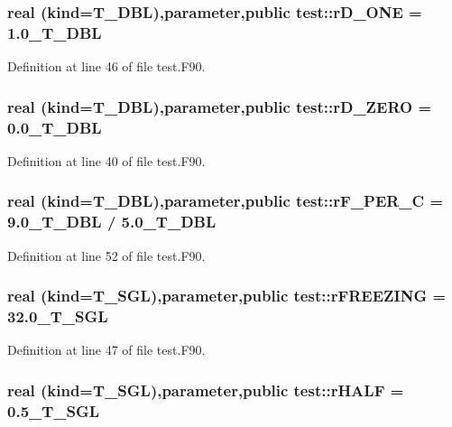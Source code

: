 \hypertarget{namespacetest_a0677b58c46e425be305a3733296635ad}{
\subsubsection[{rD\_\-ONE}]{\setlength{\rightskip}{0pt plus 5cm}real (kind={\bf T\_\-DBL}),parameter,public {\bf test::rD\_\-ONE} = 1.0\_\-T\_\-DBL}}
\label{namespacetest_a0677b58c46e425be305a3733296635ad}


Definition at line 46 of file test.F90.

\hypertarget{namespacetest_a4bd8ceae51c320c4ba797c783a5421a9}{
\subsubsection[{rD\_\-ZERO}]{\setlength{\rightskip}{0pt plus 5cm}real (kind={\bf T\_\-DBL}),parameter,public {\bf test::rD\_\-ZERO} = 0.0\_\-T\_\-DBL}}
\label{namespacetest_a4bd8ceae51c320c4ba797c783a5421a9}


Definition at line 40 of file test.F90.

\hypertarget{namespacetest_ac2670ae461db7392fc780c5fc733d06f}{
\subsubsection[{rF\_\-PER\_\-C}]{\setlength{\rightskip}{0pt plus 5cm}real (kind={\bf T\_\-DBL}),parameter,public {\bf test::rF\_\-PER\_\-C} = 9.0\_\-T\_\-DBL / 5.0\_\-T\_\-DBL}}
\label{namespacetest_ac2670ae461db7392fc780c5fc733d06f}


Definition at line 52 of file test.F90.

\hypertarget{namespacetest_a31db6c3796f52bf10cc407ec22ba3e80}{
\subsubsection[{rFREEZING}]{\setlength{\rightskip}{0pt plus 5cm}real (kind={\bf T\_\-SGL}),parameter,public {\bf test::rFREEZING} = 32.0\_\-T\_\-SGL}}
\label{namespacetest_a31db6c3796f52bf10cc407ec22ba3e80}


Definition at line 47 of file test.F90.

\hypertarget{namespacetest_a25c0227adf96fbd382b9cbac9600ba44}{
\subsubsection[{rHALF}]{\setlength{\rightskip}{0pt plus 5cm}real (kind={\bf T\_\-SGL}),parameter,public {\bf test::rHALF} = 0.5\_\-T\_\-SGL}}
\label{namespacetest_a25c0227adf96fbd382b9cbac9600ba44}


